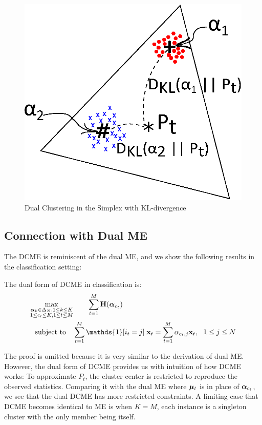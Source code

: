 \begin{figure}[h!]
  \centering
  \includegraphics[width=0.4\linewidth]{dcme/dual_cluster_color.eps}
  \caption{Dual Clustering in the Simplex with KL-divergence}
  \label{fig::dual_cluster}
\end{figure}

\subsection{Connection with Dual ME}

The DCME is reminiscent of the dual ME, and we show the following results in the
classification setting:

\begin{thm} The dual form of DCME in classification is:
  \begin{align}
    \max\limits_{\substack{\valpha_k \in \Delta_N ,  1 \le k \le K \\
                           1 \le c_t \le K , 1 \le t \le M}}
                 &\qquad
    \sum\limits_{t=1}^M \entropy(\valpha_{c_t}) \label{eq::dual_dcme_op} \\
    \subjto \quad
    & \sum\limits_{t = 1}^M \mathds{1}[i_t = j]\; \vx_t =
    \sum\limits_{t = 1}^M \alpha_{c_t, j} \vx_t,~~ 1 \le j \le N \nonumber
  \end{align}
\end{thm}

The proof is omitted because it is very similar to the derivation of dual ME.
However, the dual form of DCME provides us with intuition of how DCME works: To
approximate $P_t$, the cluster center is restricted to reproduce the observed
statistics. Comparing it with the dual ME where $\boldsymbol{\mu}_t$ is in place of
$\boldsymbol{\alpha}_{c_t}$, we see that the dual DCME has more restricted constraints. A
limiting case that DCME becomes identical to ME is when $K=M$, \ie{} each
instance is a singleton cluster with the only member being itself.
